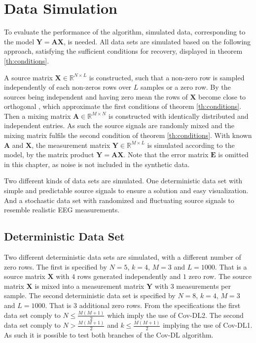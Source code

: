 \section{Data Simulation}\label{sec:dataset}
To evaluate the performance of the algorithm, simulated data, corresponding to the model $\mathbf{Y} = \mathbf{A}\mathbf{X}$, is needed. All data sets are simulated based on the following approach, satisfying the sufficient conditions for recovery, displayed in theorem \ref{th:conditions}.
 
A source matrix $\mathbf{X} \in \mathbb{R}^{N \times L}$ is constructed, such that a non-zero row is sampled independently of each non-zeros rows over $L$ samples or a zero row. 
By the sources being independent and having zero mean the rows of $\mathbf{X}$ become close to orthogonal \cite{Balkan2014}, which approximate the first conditions of theorem \ref{th:conditions}.   
Then a mixing matrix $\mathbf{A} \in \mathbb{R}^{M \times N}$ is constructed with identically distributed and independent entries. 
As such the source signals are randomly mixed and the mixing matrix fulfils the second condition of theorem \ref{th:conditions}.
With known $\mathbf{A}$ and $\mathbf{X}$, the measurement matrix $\mathbf{Y} \in \mathbb{R}^{M \times L}$ is simulated according to the model, by the matrix product $\mathbf{Y} = \mathbf{AX}$. Note that the error matrix $\mathbf{E}$ is omitted in this chapter, as noise is not included in the synthetic data.  

Two different kinds of data sets are simulated.
One deterministic data set with simple and predictable source signals to ensure a solution and easy visualization.
And a stochastic data set with randomized and fluctuating source signals to resemble realistic EEG measurements.

\subsection{Deterministic Data Set}\label{subseg_simpledata}
Two different deterministic data sets are simulated, with a different number of zero rows. 
The first is specified by $N = 5$, $k = 4$, $M = 3$ and $L = 1000$. 
That is a source matrix $\mathbf{X}$ with $4$ rows generated independently and $1$ zero row. The source matrix $\mathbf{X}$ is mixed into a measurement matrix $\mathbf{Y}$ with $3$ measurements per sample.  
The second deterministic data set is specified by $N = 8$, $k = 4$, $M = 3$ and $L = 1000$. 
That is 3 additional zero rows.
From the specifications the first data set comply to $N \leq \frac{M(M+1)}{2}$ which imply the use of Cov-DL2.
The second data set comply to $N > \frac{M(M+1)}{2}$ and $k \leq \frac{M(M+1)}{2}$ implying the use of Cov-DL1. 
As such it is possible to test both branches of the Cov-DL algorithm. 
     
